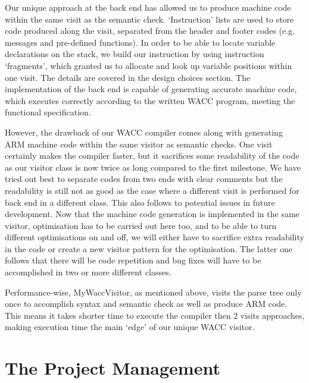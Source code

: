 \documentclass[11pt]{article}
\begin{document}
\medskip

Our unique approach at the back end has allowed us to produce machine code within the same visit as the semantic check. `Instruction' lists are used to store code produced along the visit, separated from the header and footer codes (e.g. messages and pre-defined functions). In order to be able to locate variable declarations on the stack, we build our instruction by using instruction `fragments', which granted us to allocate and look up variable positions within one visit. The details are covered in the design choices section. The implementation of the back end is capable of generating accurate machine code, which executes correctly according to the written WACC program, meeting the functional specification.

\medskip

However, the drawback of our WACC compiler comes along with generating ARM machine code within the same visitor as semantic checks. One visit certainly makes the compiler faster, but it sacrifices some readability of the code as our visitor class is now twice as long compared to the first milestone. We have tried out best to separate codes from two ends with clear comments but the readability is still not as good as the case where a different visit is performed for back end in a different class. This also follows to potential issues in future development. Now that the machine code generation is implemented in the same visitor, optimisation has to be carried out here too, and to be able to turn different optimisations on and off, we will either have to sacrifice extra readability in the code or create a new visitor pattern for the optimisation. The latter one follows that there will be code repetition and bug fixes will have to be accomplished in two or more different classes.

\medskip

Performance-wise, MyWaccVisitor, as mentioned above, visits the parse tree only once to accomplish syntax and semantic check as well as produce ARM code. This means it takes shorter time to execute the compiler then 2 visits approaches, making execution time the main `edge' of our unique WACC visitor.

\section{The Project Management}
\end{document}
